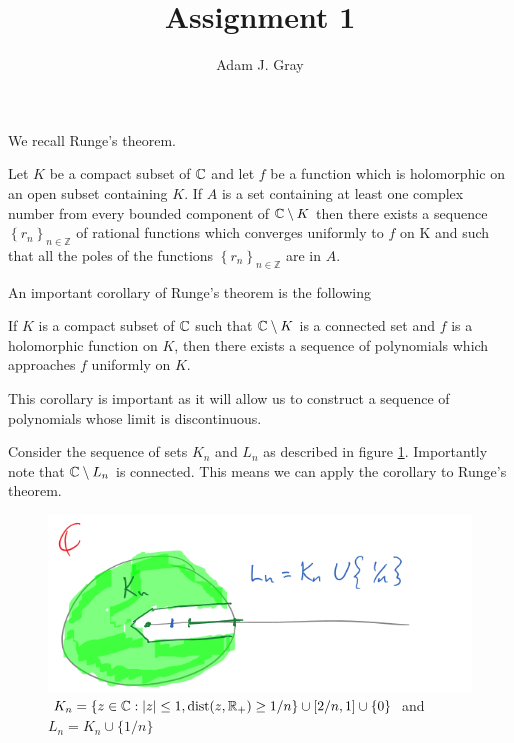 \documentclass{unswmaths}
\begin{document}
\author{Adam J. Gray}
\title{Assignment 1}
\subject{Complex Analysis}

\newcommand{\llra}{\Leftrightarrow}

\unswtitle

\section{}
\section{}
We recall Runge's theorem.
\begin{theorem}
Let $K $ be a compact subset of $ \mathbb{C} $ and let $ f $ be a function which is holomorphic on an open subset containing $ K $. If $ A $ is a set containing at least one complex number from every bounded component of $ \mathbb{C} \setminus K $ then there exists a sequence $ \left\{ r_n\right\}_{n \in \mathbb{Z}} $ of rational functions which converges uniformly to $ f $ on K and such that all the poles of the functions $ \left\{ r_n\right\}_{n \in \mathbb{Z}} $ are in $ A $.  
\end{theorem}

An important corollary of Runge's theorem is the following
\begin{corollary}
	If $ K $ is a compact subset of $ \mathbb{C} $ such that $ \mathbb{C} \setminus K $ is a connected set and $ f $ is a holomorphic function on $ K $, then there exists a sequence of polynomials which approaches $ f $ uniformly on $ K $.
\end{corollary}

This corollary is important as it will allow us to construct a sequence of polynomials whose limit is discontinuous. 

Consider the sequence of sets $ K_n $ and $ L_n $ as described in figure \ref{fig:1}. Importantly note that $ \mathbb{C} \setminus L_n $ is connected. This means we can apply the corollary to Runge's theorem.
\begin{figure}[h]
	\includegraphics[scale=1]{ComplexDomainTask2Qn2}
	\caption{$K_n = \{ z \in \mathbb{C} : |z| \leq 1, \operatorname{dist}(z, \mathbb{R}_+) \geq 1/n \} \cup [2 / n, 1] \cup \{0 \}$ and $ L_n = K_n \cup \{ 1 / n \} $}
		\label{fig:1}
\end{figure}
\end{document}
